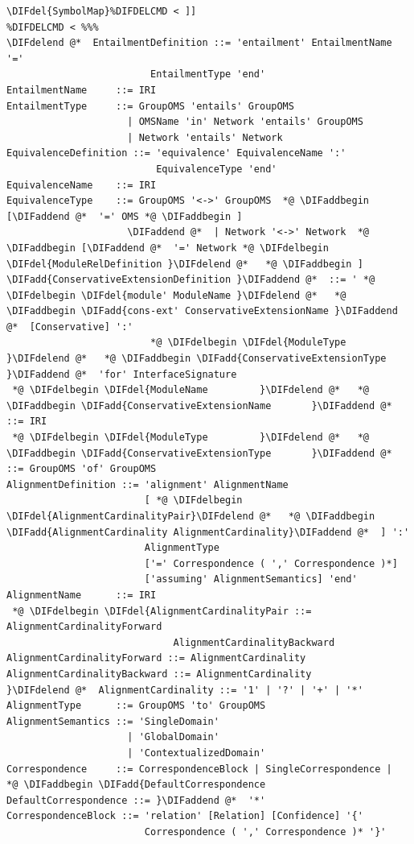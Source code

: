 \documentclass[10pt,fleqn,final]{scrreprt}
\newenvironment{definitions}[0]{\medskip }{}
\providecommand{\DIFadd}[1]{{\protect\color{blue}\uwave{#1}}} %
\providecommand{\DIFdel}[1]{{\protect\color{red}\sout{#1}}}                      %
\providecommand{\DIFaddbegin}{} %
\providecommand{\DIFaddend}{} %
\providecommand{\DIFdelbegin}{} %
\providecommand{\DIFdelend}{} %
\begin{document}
\begin{definitions}
\begin{lstlisting}[language=ebnf,mathescape]
\DIFdel{SymbolMap}%DIFDELCMD < ]]
%DIFDELCMD < %%%
\DIFdelend @*  EntailmentDefinition ::= 'entailment' EntailmentName '='
                         EntailmentType 'end'
EntailmentName     ::= IRI
EntailmentType     ::= GroupOMS 'entails' GroupOMS
                     | OMSName 'in' Network 'entails' GroupOMS
                     | Network 'entails' Network
EquivalenceDefinition ::= 'equivalence' EquivalenceName ':'
                          EquivalenceType 'end'
EquivalenceName    ::= IRI
EquivalenceType    ::= GroupOMS '<->' GroupOMS  *@ \DIFaddbegin [\DIFaddend @*  '=' OMS *@ \DIFaddbegin ]
                     \DIFaddend @*  | Network '<->' Network  *@ \DIFaddbegin [\DIFaddend @*  '=' Network *@ \DIFdelbegin \DIFdel{ModuleRelDefinition }\DIFdelend @*   *@ \DIFaddbegin ]
\DIFadd{ConservativeExtensionDefinition }\DIFaddend @*  ::= ' *@ \DIFdelbegin \DIFdel{module' ModuleName }\DIFdelend @*   *@ \DIFaddbegin \DIFadd{cons-ext' ConservativeExtensionName }\DIFaddend @*  [Conservative] ':'
                         *@ \DIFdelbegin \DIFdel{ModuleType }\DIFdelend @*   *@ \DIFaddbegin \DIFadd{ConservativeExtensionType }\DIFaddend @*  'for' InterfaceSignature
 *@ \DIFdelbegin \DIFdel{ModuleName         }\DIFdelend @*   *@ \DIFaddbegin \DIFadd{ConservativeExtensionName       }\DIFaddend @*  ::= IRI
 *@ \DIFdelbegin \DIFdel{ModuleType         }\DIFdelend @*   *@ \DIFaddbegin \DIFadd{ConservativeExtensionType       }\DIFaddend @*  ::= GroupOMS 'of' GroupOMS
AlignmentDefinition ::= 'alignment' AlignmentName
                        [ *@ \DIFdelbegin \DIFdel{AlignmentCardinalityPair}\DIFdelend @*   *@ \DIFaddbegin \DIFadd{AlignmentCardinality AlignmentCardinality}\DIFaddend @*  ] ':'
                        AlignmentType
                        ['=' Correspondence ( ',' Correspondence )*]
                        ['assuming' AlignmentSemantics] 'end'
AlignmentName      ::= IRI
 *@ \DIFdelbegin \DIFdel{AlignmentCardinalityPair ::= AlignmentCardinalityForward
                             AlignmentCardinalityBackward
AlignmentCardinalityForward ::= AlignmentCardinality
AlignmentCardinalityBackward ::= AlignmentCardinality
}\DIFdelend @*  AlignmentCardinality ::= '1' | '?' | '+' | '*'
AlignmentType      ::= GroupOMS 'to' GroupOMS
AlignmentSemantics ::= 'SingleDomain'
                     | 'GlobalDomain'
                     | 'ContextualizedDomain'
Correspondence     ::= CorrespondenceBlock | SingleCorrespondence |  *@ \DIFaddbegin \DIFadd{DefaultCorrespondence
DefaultCorrespondence ::= }\DIFaddend @*  '*' 
CorrespondenceBlock ::= 'relation' [Relation] [Confidence] '{'
                        Correspondence ( ',' Correspondence )* '}'

\end{lstlisting}
\end{definitions}
\end{document}

